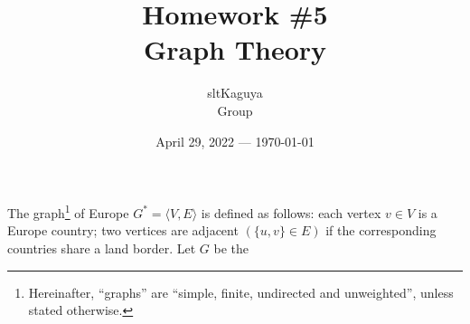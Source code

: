 \documentclass[a4paper,12pt]{article}
\title{Homework \#5\\
    \large Graph Theory}
\author{sltKaguya\\
    \large Group}
\date{April 29, 2022 --- \today}
\begin{document}
\maketitle

\begin{tasks}
    \item The graph\footnote{Hereinafter, \enquote{graphs} are \enquote{simple, finite, undirected and unweighted}, unless stated otherwise.} of Europe $G^* = \langle V, E\rangle$ is defined as follows: each vertex $v \in V$ is a Europe country; two vertices are adjacent $(\{u, v\} \in E)$ if the corresponding countries share a land border. Let $G$ be the 
\end{tasks}
\end{document}
